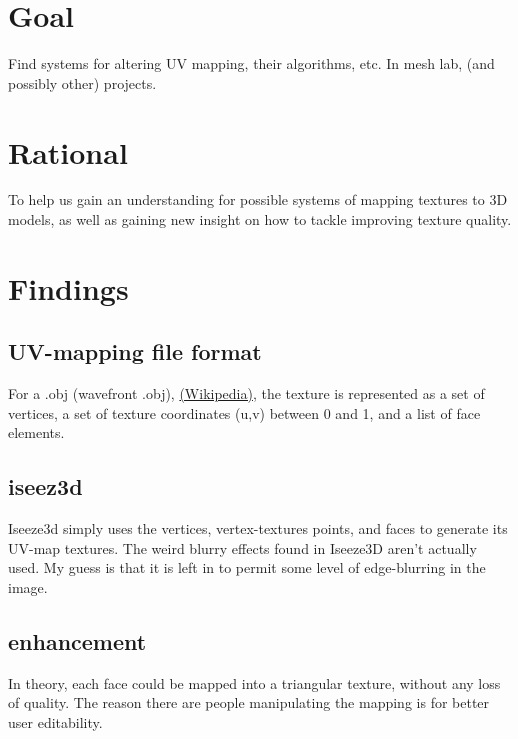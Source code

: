 \documentclass{article}
\begin{document}
\section{Goal}

Find systems for altering UV mapping, their algorithms, etc. In mesh lab, (and possibly other) projects.

\section{Rational}

To help us gain an understanding for possible systems of mapping textures to 3D models, as well as gaining new insight on how to tackle improving texture quality.

\section{Findings}

\subsection{UV-mapping file format}
For a .obj (wavefront .obj), \href{https://en.wikipedia.org/wiki/Wavefront_.obj_file}{(Wikipedia)}, the texture is represented as a set of vertices, a set of texture coordinates (u,v) between 0 and 1, and a list of face elements.

\subsection{iseez3d}
Iseeze3d simply uses the vertices, vertex-textures points, and faces to generate its UV-map textures. The weird blurry effects found in Iseeze3D aren't actually used. My guess is that it is left in to permit some level of edge-blurring in the image.

\subsection{enhancement}
In theory, each face could be mapped into a triangular texture, without any loss of quality. The reason there are people manipulating the mapping is for better user editability.

 
\end{document}
